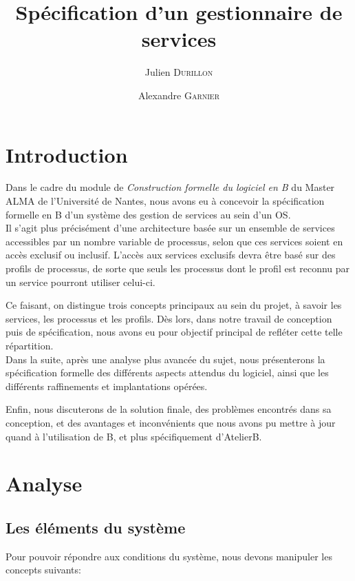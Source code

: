 \documentclass[french, 11pt, a4paper]{article}
\author{Julien \textsc{Durillon} \and Alexandre \textsc{Garnier}}
\title{Spécification d'un gestionnaire de services}
\begin{document}
\maketitle

\section{Introduction}

Dans le cadre du module de \emph{Construction formelle du logiciel en B} du
Master ALMA de l'Université de Nantes, nous avons eu à concevoir la
spécification formelle en B d'un système des gestion de services au sein d'un
OS.\\

Il s'agit plus précisément d'une architecture basée sur un ensemble de services
accessibles par un nombre variable de processus, selon que ces services soient
en accès exclusif ou inclusif. L'accès aux services exclusifs devra être basé
sur des profils de processus, de sorte que seuls les processus dont le profil
est reconnu par un service pourront utiliser celui-ci.

Ce faisant, on distingue trois concepts principaux au sein du projet, à savoir
les services, les processus et les profils. Dès lors, dans notre travail de
conception puis de spécification, nous avons eu pour objectif principal de
refléter cette telle répartition.\\

Dans la suite, après une analyse plus avancée du sujet, nous présenterons la
spécification formelle des différents aspects attendus du logiciel, ainsi que
les différents raffinements et implantations opérées.

Enfin, nous discuterons de la solution finale, des problèmes encontrés dans sa
conception, et des avantages et inconvénients que nous avons pu mettre à jour
quand à l'utilisation de B, et plus spécifiquement d'AtelierB.

\section{Analyse}

\subsection{Les éléments du système}

Pour pouvoir répondre aux conditions du système, nous devons manipuler les
concepts suivants:
\end{document}
